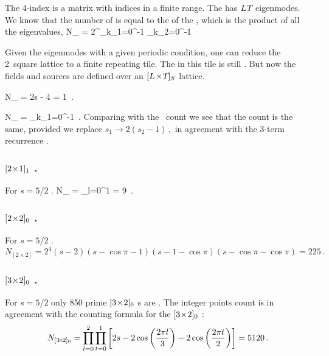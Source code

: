 The 4-index {\jacobianOrb}  is a matrix with indices in a
finite range. The {\jacobianOrb} has ${L_{}}{T_{}}$ eigenmodes. We
know that the number of {\twots} is equal to the {\HillDet} of the
{\jacobianOrb}, which is the product of all the eigenvalues,
\beq
N_{\LTS{}{}{}}
=  2^{\speriod{}\period{}}\prod_{k_1=0}^{\speriod{}-1} \prod_{k_2=0}^{\period{}-1}
\label{2DCountingFormula}
\eeq

Given the eigenmodes with a given periodic condition, one can reduce the
2\dmn\ square lattice to a finite repeating tile. The {\sPe} in this tile
is still . But now the fields and sources are defined over an
${[{L_{}}\!\times\!{T_{}}]_{S_{}}}$ lattice.

\beq
N_{} =  2s - 4 = 1
 \,.
\label{1x1DCount}
\eeq

\beq
N_{}
=  \prod_{k_1=0}^{\speriod{}-1}
 \,.
\label{2Dto1DCount}
\eeq
Comparing with the \templatt\ count  we see
that the count is the same, provided we replace
\(
{s}_1\to2({s}_2-1)
\,,
\)
in agreement with the 3-term recurrence .


\subsubsection{${[2\!\times\!1]_{1}}$ \twots.}
\label{s:catLatt2x2rel1}
For $s=5/2$ \catlatt.
\beq
N_{}
= \prod_{l=0}^{1}
= 9
 \,.

\subsubsection{$\BravCell{2}{2}{0}$ \twots.}
\label{s:catLatt2x2}
For $s=5/2$ \catlatt.
\[
N_{[2\!\times\!2]} =
2^4({s}- 2)({s}- \cos\pi -1)({s}- 1 - \cos\pi)({s}- \cos\pi - \cos\pi) = 225
\,.
\]

\subsubsection{${[3\!\times\!2]_{0}}$ \twots.}
\label{s:catLattRel3x2}
For $s=5/2$ only 850 prime ${[3\!\times\!2]_{0}}$ \brick s are \admissible. The
integer points count  is in agreement with the
counting formula  for the ${[3\!\times\!2]_{0}}$
\twots:
     \[
N_{{[3\!\times\!2]_{0}}}
  = \prod_{l=0}^2\prod_{t=0}^1\left[
  2{s}-2\cos\left(\frac{2 \pi l}{3}\right)-2\cos\left(\frac{2 \pi t}{2}\right)
                              \right]
  = 5120
     \,.
     \]

\renewcommand{\statesp}{phase space}
\renewcommand{\Statesp}{Phase space}
\renewcommand{\stateDsp}{phase-space}
\renewcommand{\StateDsp}{Phase-space}
